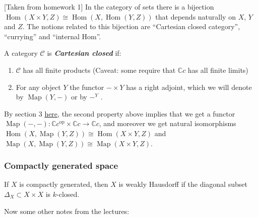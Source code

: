 [Taken from homework 1]
	In the category of sets there is a bijection $\operatorname{Hom}(X\times Y, Z)\cong \operatorname{Hom}(X, \operatorname{Hom}(Y, Z))$ that depends naturally on $X$, $Y$ and $Z$. The notions related to this bijection are “Cartesian closed category”, “currying” and “internal Hom”.
\begin{defn}
	A category $\mathcal{C}$ is \textbf{\textit{Cartesian closed}} if:
	\begin{enumerate}
		\item $\mathcal{C}$ has all finite products (Caveat: some require that $\mathbb{C}c$ has all finite limits)
		\item For any object $Y$ the functor $- \times Y$ has a right adjoint, which we will denote by $\operatorname{Map}(Y,-)$ or by $-^Y$ .
	\end{enumerate}
\end{defn}
\begin{remark}
	By section 3 \href{https://ncatlab.org/nlab/show/internal+hom }{here}, the second property above implies that we get a functor $\operatorname{Map}(-,-) : \mathbb{C}c^{\operatorname{op}} \times \mathbb{C}c \to \mathbb{C}c$, and moreover we get natural isomorphisms $\operatorname{Hom}(X, \operatorname{Map}(Y, Z)) \cong \operatorname{Hom}(X \times Y, Z)$ and $\operatorname{Map}(X, \operatorname{Map}(Y, Z))\cong \operatorname{Map}(X \times Y, Z)$.
\end{remark}

\subsubsection*{Compactly generated space}

\begin{claim}
		If $X$ is compactly generated, then $X$ is weakly Hausdorff if the diagonal subset $\Delta_X\subset X\times X$ is {\color{orange}$k$-closed}.
\end{claim}
	 Now some other notes from the lectures:
	
